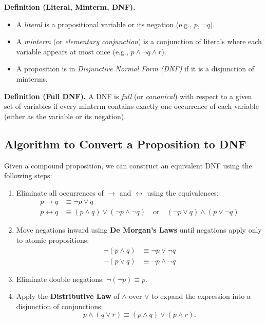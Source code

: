 \documentclass[11pt,a4paper]{article}
\begin{document}
\textbf{Definition (Literal, Minterm, DNF).}
\begin{itemize}
    \item A \textit{literal} is a propositional variable or its negation (e.g., $p$, $\neg q$).
    \item A \textit{minterm} (or \textit{elementary conjunction}) is a conjunction of literals where each variable appears at most once (e.g., $p \land \neg q \land r$).
    \item A proposition is in \textit{Disjunctive Normal Form (DNF)} if it is a disjunction of minterms.
\end{itemize}

\textbf{Definition (Full DNF).} A DNF is \textit{full} (or \textit{canonical}) with respect to a given set of variables if every minterm contains exactly one occurrence of each variable (either as the variable or its negation).

\subsection{Algorithm to Convert a Proposition to DNF}

Given a compound proposition, we can construct an equivalent DNF using the following steps:

\begin{enumerate}[label=\textbf{Step \arabic*:}]
    \item Eliminate all occurrences of $\to$ and $\leftrightarrow$ using the equivalences:
    \begin{align*}
        p \to q &\equiv \neg p \lor q \\
        p \leftrightarrow q &\equiv (p \land q) \lor (\neg p \land \neg q) \quad \text{or} \quad (\neg p \lor q) \land (p \lor \neg q)
    \end{align*}
    \item Move negations inward using \textbf{De Morgan's Laws} until negations apply only to atomic propositions:
    \begin{align*}
        \neg(p \land q) &\equiv \neg p \lor \neg q \\
        \neg(p \lor q) &\equiv \neg p \land \neg q
    \end{align*}
    \item Eliminate double negations: $\neg(\neg p) \equiv p$.
    \item Apply the \textbf{Distributive Law} of $\land$ over $\lor$ to expand the expression into a disjunction of conjunctions:
    \begin{equation*}
        p \land (q \lor r) \equiv (p \land q) \lor (p \land r).
    \end{equation*}
\end{enumerate}
\end{document}
